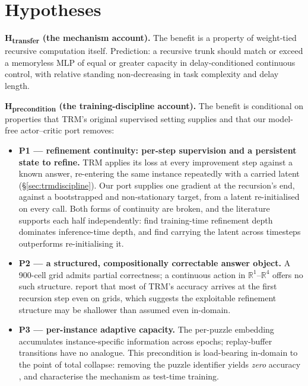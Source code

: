 \documentclass[11pt]{article}
\begin{document}
\section{Hypotheses}
\label{sec:hypotheses}

\textbf{H\textsubscript{transfer} (the mechanism account).} The benefit is a property of weight-tied recursive computation itself. Prediction: a recursive trunk should match or exceed a memoryless MLP of equal or greater capacity in delay-conditioned continuous control, with relative standing non-decreasing in task complexity and delay length.

\textbf{H\textsubscript{precondition} (the training-discipline account).} The benefit is conditional on properties that TRM's original supervised setting supplies and that our model-free actor--critic port removes:

\begin{itemize}
  \item \textbf{P1 --- refinement continuity: per-step supervision and a persistent state to refine.} TRM applies its loss at every improvement step against a known answer, re-entering the same instance repeatedly with a carried latent (\S\ref{sec:trmdiscipline}). Our port supplies one gradient at the recursion's end, against a bootstrapped and non-stationary target, from a latent re-initialised on every call. Both forms of continuity are broken, and the literature supports each half independently: \citet{arcprize2025hrm} find training-time refinement depth dominates inference-time depth, and \citet{dang2025hrmagent} find carrying the latent across timesteps outperforms re-initialising it.
  \item \textbf{P2 --- a structured, compositionally correctable answer object.} A 900-cell grid admits partial correctness; a continuous action in $\mathbb{R}^1$--$\mathbb{R}^4$ offers no such structure. \citet{royeazar2026trm} report that most of TRM's accuracy arrives at the first recursion step even on grids, which suggests the exploitable refinement structure may be shallower than assumed even in-domain.
  \item \textbf{P3 --- per-instance adaptive capacity.} The per-puzzle embedding accumulates instance-specific information across epochs; replay-buffer transitions have no analogue. This precondition is load-bearing in-domain to the point of total collapse: removing the puzzle identifier yields \emph{zero} accuracy \citep{royeazar2026trm}, and \citet{arcprize2025hrm} characterise the mechanism as test-time training.
\end{itemize}
\end{document}
